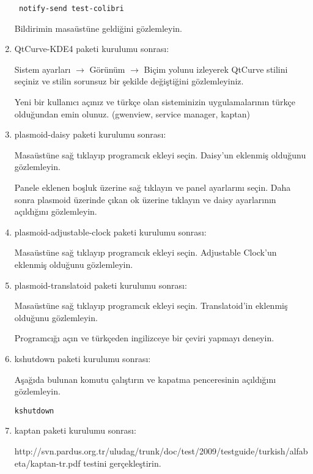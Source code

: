 \documentclass[a4paper,10pt]{article}
\begin{document}
\begin{enumerate}
\begin{verbatim}
 notify-send test-colibri 
\end{verbatim}

 Bildirimin masaüstüne geldiğini gözlemleyin.

 \item  QtCurve-KDE4 paketi kurulumu sonrası:

Sistem ayarları $\rightarrow$ Görünüm $\rightarrow$ Biçim yolunu izleyerek QtCurve stilini seçiniz ve stilin sorunsuz bir şekilde değiştiğini gözlemleyiniz.

Yeni bir kullanıcı açınız ve türkçe olan sisteminizin uygulamalarının türkçe olduğundan emin olunuz. (gwenview, service manager, kaptan)

\item plasmoid-daisy paketi kurulumu sonrası:

Masaüstüne sağ tıklayıp programcık ekleyi seçin. Daisy'un eklenmiş olduğunu gözlemleyin.

Panele eklenen boşluk üzerine sağ tıklayın ve panel ayarlarını seçin. Daha sonra plasmoid üzerinde çıkan ok üzerine tıklayın ve daisy ayarlarının açıldığını gözlemleyin.

 \item plasmoid-adjustable-clock paketi kurulumu sonrası:

Masaüstüne sağ tıklayıp programcık ekleyi seçin. Adjustable Clock'un eklenmiş olduğunu gözlemleyin.


 \item plasmoid-translatoid paketi kurulumu sonrası:

Masaüstüne sağ tıklayıp programcık ekleyi seçin. Translatoid'in eklenmiş olduğunu gözlemleyin.

Programcığı açın ve türkçeden ingilizceye bir çeviri yapmayı deneyin.
 \item kshutdown paketi kurulumu sonrası:

Aşağıda bulunan komutu çalıştırın ve kapatma penceresinin açıldığını gözlemleyin.
\begin{verbatim}
kshutdown 
\end{verbatim}

 \item kaptan paketi kurulumu sonrası:

  http://svn.pardus.org.tr/uludag/trunk/doc/test/2009/testguide/turkish/alfabeta/kaptan-tr.pdf testini gerçekleştirin.

\end{enumerate}
\end{document}
